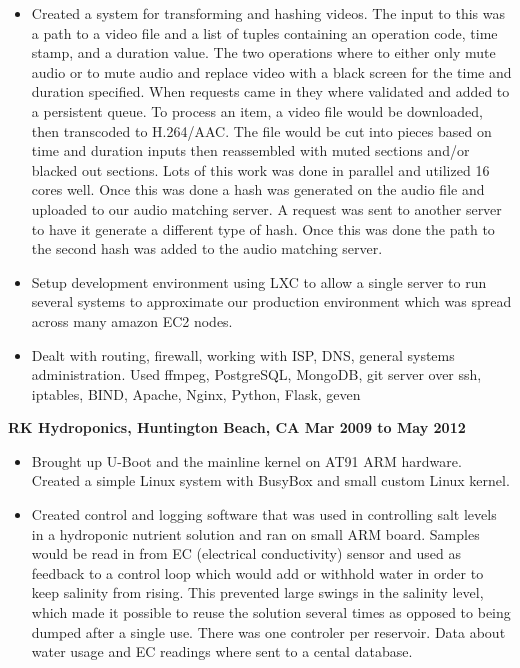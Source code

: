 \documentclass{res}
\begin{document}
\begin{resume}
\begin{itemize}
\item

Created a system for transforming and hashing videos.  The input to this
was a path to a video file and a list of tuples containing an operation code,
time stamp, and a duration value.  The two operations where to either only mute
audio or to mute audio and replace video with a black screen for
the time and duration specified.
When requests came in they where validated and added to a
persistent queue.  To process an item, a video file would be downloaded, then
transcoded to H.264/AAC.  The file would be cut into pieces based on time and
duration inputs then reassembled with muted sections and/or blacked out
sections.  Lots of this work was done in parallel and utilized
16 cores well.  Once this was done a hash was generated on the audio file
and uploaded to our audio matching server.  A request was sent to another 
server to have it generate a different type of hash.  Once this was done
the path to the second hash was added to the audio matching server.

\item
Setup  development  environment using LXC to allow a single server
to run several systems to approximate our production environment which
was spread across many amazon EC2 nodes.

\item
Dealt with routing, firewall, working with ISP, DNS,
general systems administration.  Used ffmpeg, PostgreSQL, MongoDB, git server
over ssh, iptables, BIND, Apache, Nginx, Python, Flask, geven

\end{itemize}


{\large \bf RK Hydroponics, Huntington Beach, CA \hfill Mar 2009 to May 2012}
\begin{itemize}

\item
Brought up U-Boot and the mainline kernel on AT91 ARM hardware.  Created
a simple Linux system with BusyBox and small custom Linux kernel.

\item
Created control and logging software that was used in controlling
salt levels in a hydroponic nutrient solution and ran on small ARM board.
Samples would be read
in from EC (electrical conductivity) sensor and used as feedback
to a control loop
which would add or withhold water in order to keep salinity from rising.
This prevented large swings in the salinity level, which made it possible
to reuse the solution several times as opposed to being dumped after a
single use.  There was one controler per reservoir.  Data about water
usage and EC readings where sent to a cental database.


\end{itemize}
\end{resume}
\end{document}
